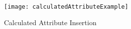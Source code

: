 \begin{figure}[htbp]
	\centering
	\texttt{[image: calculatedAttributeExample]}
	\caption{Calculated Attribute Insertion}
	\label{fig:calculated_attribute_example}
\end{figure}


